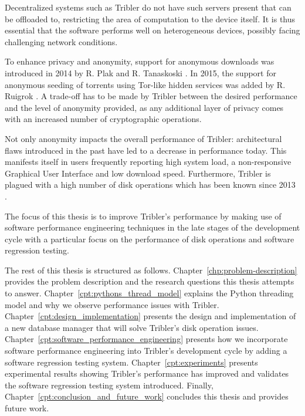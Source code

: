 Decentralized systems such as Tribler do not have such servers present that can be offloaded to, restricting the area of computation to the device itself.
It is thus essential that the software performs well on heterogeneous devices, possibly facing challenging network conditions.

To enhance privacy and anonymity, support for anonymous downloads was introduced in 2014 by R. Plak \cite{plak2014anonymous} and R. Tanaskoski \cite{tanaskoski2014anonymous}.
In 2015, the support for anonymous seeding of torrents using Tor-like hidden services was added by R. Ruigrok \cite{ruigrok2015bittorrent}.
A trade-off has to be made by Tribler between the desired performance and the level of anonymity provided, as any additional layer of privacy comes with an increased number of cryptographic operations.

Not only anonymity impacts the overall performance of Tribler: architectural flaws introduced in the past have led to a decrease in performance today.
This manifests itself in users frequently reporting high system load, a non-responsive Graphical User Interface and low download speed.
Furthermore, Tribler is plagued with a high number of disk operations which has been known since 2013 \cite{pouwelse2014reduce}. 

The focus of this thesis is to improve Tribler's performance by making use of software performance engineering techniques in the late stages of the development cycle with a particular focus on the performance of disk operations and software regression testing.

The rest of this thesis is structured as follows.
Chapter~\ref{chp:problem-description} provides the problem description and the research questions this thesis attempts to answer.
Chapter~\ref{cpt:pythons_thread_model} explains the Python threading model and why we observe performance issues with Tribler.
Chapter~\ref{cpt:design_implementation} presents the design and implementation of a new database manager that will solve Tribler's disk operation issues.
Chapter~\ref{cpt:software_performance_engineering} presents how we incorporate software performance engineering into Tribler's development cycle by adding a software regression testing system.
Chapter~\ref{cpt:experiments} presents experimental results showing Tribler's performance has improved and validates the software regression testing system introduced.
Finally, Chapter~\ref{cpt:conclusion_and_future_work} concludes this thesis and provides future work.
